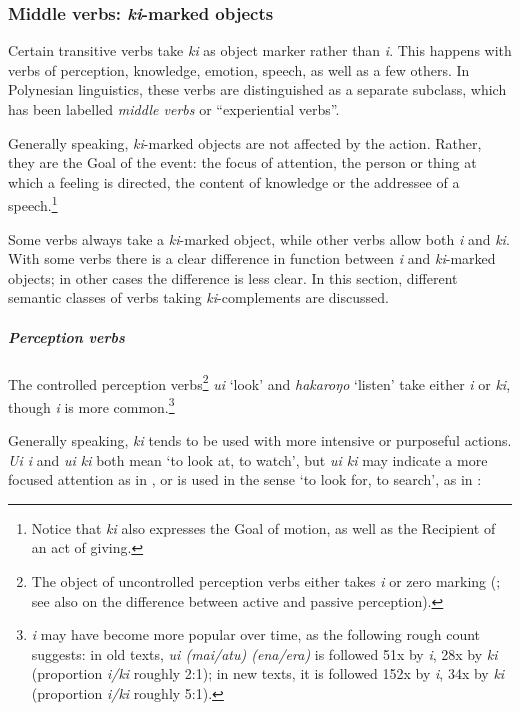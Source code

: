 \subsubsection[Middle verbs: ki{}-marked objects]{Middle verbs: \textit{ki}{}-marked objects}\label{sec:8.6.4.2}
Certain transitive verbs take \textit{ki} as object marker rather than \textit{i}. This happens with verbs of perception, knowledge, emotion, speech, as well as a few others. In Polynesian linguistics, these verbs are distinguished as a separate subclass, which has been labelled \textit{middle verbs} or “experiential verbs”.

Generally speaking, \textit{ki}{}-marked objects are not affected by the action. Rather, they are the Goal of the event: the focus of attention, the person or thing at which a feeling is directed, the content of knowledge or the addressee of a speech.\footnote{\label{fn:433}Notice that \textit{ki} also expresses the Goal of motion, as well as the Recipient of an act of giving.} 

Some verbs always take a \textit{ki}{}-marked object, while other verbs allow both \textit{i} and \textit{ki}. With some verbs there is a clear difference in function between \textit{i} and \textit{ki}{}-marked objects; in other cases the difference is less clear. In this section, different semantic classes of verbs taking \textit{ki}{}-complements are discussed.

\subparagraph{Perception verbs} The controlled perception verbs\footnote{\label{fn:434}The object of uncontrolled perception verbs either takes \textit{i} or zero marking (; see also  on the difference between active and passive perception).} \textit{u{\ꞌ}i} ‘look’ and \textit{hakaroŋo} ‘listen’ take either \textit{i} or \textit{ki}, though \textit{i} is more common.\footnote{\label{fn:435}\textit{i} may have become more popular over time, as the following rough count suggests: in old texts, \textit{u{\ꞌ}i (mai/atu) (ena/era)} is followed 51x by \textit{i}, 28x by \textit{ki} (proportion \textit{i/ki} roughly 2:1); in new texts, it is followed 152x by \textit{i}, 34x by \textit{ki} (proportion \textit{i/ki} roughly 5:1).} 

Generally speaking, \textit{ki} tends to be used with more intensive or purposeful actions. \textit{\mbox{U{\ꞌ}i} i} and \textit{u{\ꞌ}i ki} both mean ‘to look at, to watch’, but \textit{u{\ꞌ}i ki} may indicate a more focused attention as in , or is used in the sense ‘to look for, to search’, as in :

